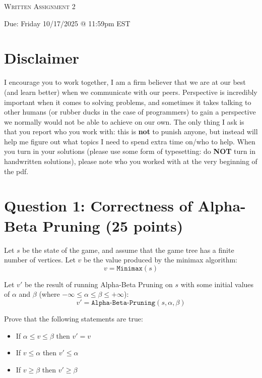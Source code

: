 \documentclass[11pt]{article}
\newcommand{\question}[1]{\section*{\normalsize #1}}
\begin{document}
\begin{center}
    {\Large \textsc{Written Assignment 2}}
\end{center}
\begin{center}
    Due: Friday 10/17/2025 @ 11:59pm EST
\end{center}

\section*{\textbf{Disclaimer}}
I encourage you to work together, I am a firm believer that we are at our best (and learn better) when we communicate with our peers. Perspective is incredibly important when it comes to solving problems, and sometimes it takes talking to other humans (or rubber ducks in the case of programmers) to gain a perspective we normally would not be able to achieve on our own. The only thing I ask is that you report who you work with: this is \textbf{not} to punish anyone, but instead will help me figure out what topics I need to spend extra time on/who to help. When you turn in your solutions (please use some form of typesetting: do \textbf{NOT} turn in handwritten solutions), please note who you worked with at the very beginning of the pdf.\newline












\question{Question 1: Correctness of Alpha-Beta Pruning (25 points)}
Let $s$ be the state of the game, and assume that the game tree has a finite number of vertices. Let $v$ be the value produced by the minimax algorithm:
$$v = \texttt{Minimax}(s)$$

\noindent Let $v'$ be the result of running Alpha-Beta Pruning on $s$ with some initial values of $\alpha$ and $\beta$ (where $-\infty\le \alpha\le\beta\le+\infty$):
$$v' = \texttt{Alpha-Beta-Pruning}(s, \alpha, \beta)$$

\noindent Prove that the following statements are true:
\begin{itemize}
    \item If $\alpha \le v \le \beta$ then $v' = v$
    \item If $v\le \alpha$ then $v'\le \alpha$
    \item If $v \ge \beta$ then $v'\ge \beta$
\end{itemize}
\end{document}
